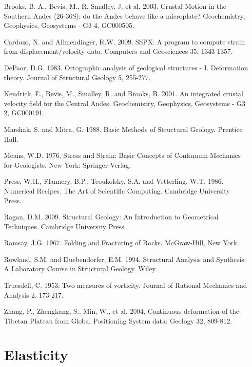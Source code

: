 \documentclass[a4paper , 12pt]{book}
\begin{document}
Brooks, B. A., Bevis, M., R. Smalley, J. et al. 2003. Crustal Motion in the Southern Andes (26-36\degree\space S): do the Andes behave like a microplate? Geochemistry, Geophysics, Geosystems - G3 4, GC000505.

Cardozo, N. and Allmendinger, R.W. 2009. SSPX: A program to compute strain from displacement/velocity data. Computers and Geosciences 35, 1343-1357.

DePaor, D.G. 1983. Ortographic analysis of geological structures - I. Deformation theory. Journal of Structural Geology 5, 255-277.

Kendrick, E., Bevis, M., Smalley, R. and Brooks, B. 2001. An integrated crustal velocity field for the Central Andes. Geochemistry, Geophysics, Geosystems - G3 2, GC000191.

Marshak, S. and Mitra, G. 1988. Basic Methods of Structural Geology. Prentice Hall.

Means, W.D. 1976. Stress and Strain: Basic Concepts of Continuum Mechanics for Geologists. New York: Springer-Verlag.

Press, W.H., Flannery, B.P., Teoukolsky, S.A. and Vetterling, W.T. 1986. Numerical Recipes: The Art of Scientific Computing. Cambridge University Press.

Ragan, D.M. 2009. Structural Geology: An Introduction to Geometrical Techniques. Cambridge University Press.

Ramsay, J.G. 1967. Folding and Fracturing of Rocks. McGraw-Hill, New York.

Rowland, S.M. and Duebendorfer, E.M. 1994. Structural Analysis and Synthesis: A Laboratory Course in Structural Geology. Wiley.

Truesdell, C. 1953. Two measures of vorticity. Journal of Rational Mechanics and Analysis 2, 173-217.

Zhang, P., Zhengkang, S., Min, W., et al. 2004, Continuous deformation of the Tibetan Plateau from Global Positioning System data: Geology 32, 809-812.

\chapter{Elasticity}
\end{document}
